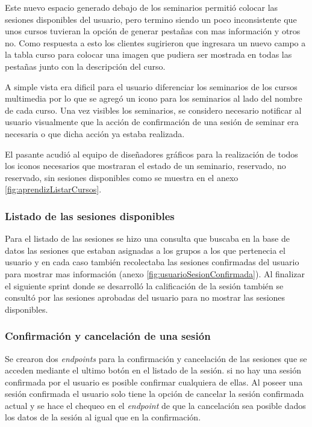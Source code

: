 Este nuevo espacio generado debajo de los seminarios permitió colocar las sesiones disponibles del usuario, pero termino siendo un poco inconsistente que unos cursos tuvieran la opción de generar pestañas con mas información y otros no. Como respuesta a esto los clientes sugirieron que ingresara un nuevo campo a la tabla curso para colocar una imagen que pudiera ser mostrada en todas las pestañas junto con la descripción del curso.

A simple vista era dificil para el usuario diferenciar los seminarios de los cursos multimedia por lo que se agregó un icono para los seminarios al lado del nombre de cada curso. Una vez visibles los seminarios, se considero necesario notificar al usuario visualmente que la acción de confirmación de una sesión de seminar era necesaria o que dicha acción ya estaba realizada.

El pasante acudió al equipo de diseñadores gráficos para la realización de todos los iconos necesarios que mostraran el estado de un seminario, reservado, no reservado, sin sesiones disponibles como se muestra en el anexo \ref{fig:aprendizListarCursos}.

\subsubsection{Listado de las sesiones disponibles}
Para el listado de las sesiones se hizo una consulta que buscaba en la base de datos las sesiones que estaban asignadas a los grupos a los que pertenecia el usuario y en cada caso también recolectaba las sesiones confirmadas del usuario para mostrar mas información (anexo \ref{fig:usuarioSesionConfirmada}). Al finalizar el siguiente sprint donde se desarrolló la calificación de la sesión también se consultó por las sesiones aprobadas del usuario para no mostrar las sesiones disponibles.

\subsubsection{Confirmación y cancelación de una sesión}

Se crearon dos \emph{endpoints} para la confirmación y cancelación de las sesiones que se acceden mediante el ultimo botón en el listado de la sesión. si no hay una sesión confirmada por el usuario es posible confirmar cualquiera de ellas. Al poseer una sesión confirmada el usuario solo tiene la opción de cancelar la sesión confirmada actual y se hace el chequeo en el \emph{endpoint} de que la cancelación sea posible dados los datos de la sesión al igual que en la confirmación.

